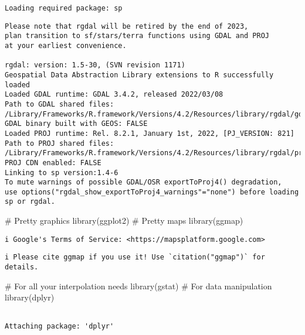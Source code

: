 \documentclass[
  letterpaper,
  krantz2]{style/krantz}
\newenvironment{Shaded}{\begin{snugshade}}{\end{snugshade}}
\newcommand{\CommentTok}[1]{\textcolor[rgb]{0.37,0.37,0.37}{#1}}
\newcommand{\FunctionTok}[1]{\textcolor[rgb]{0.28,0.35,0.67}{#1}}
\newcommand{\NormalTok}[1]{\textcolor[rgb]{0.00,0.23,0.31}{#1}}
\begin{document}
\begin{verbatim}
Loading required package: sp
\end{verbatim}

\begin{verbatim}
Please note that rgdal will be retired by the end of 2023,
plan transition to sf/stars/terra functions using GDAL and PROJ
at your earliest convenience.

rgdal: version: 1.5-30, (SVN revision 1171)
Geospatial Data Abstraction Library extensions to R successfully loaded
Loaded GDAL runtime: GDAL 3.4.2, released 2022/03/08
Path to GDAL shared files: /Library/Frameworks/R.framework/Versions/4.2/Resources/library/rgdal/gdal
GDAL binary built with GEOS: FALSE 
Loaded PROJ runtime: Rel. 8.2.1, January 1st, 2022, [PJ_VERSION: 821]
Path to PROJ shared files: /Library/Frameworks/R.framework/Versions/4.2/Resources/library/rgdal/proj
PROJ CDN enabled: FALSE
Linking to sp version:1.4-6
To mute warnings of possible GDAL/OSR exportToProj4() degradation,
use options("rgdal_show_exportToProj4_warnings"="none") before loading sp or rgdal.
\end{verbatim}

\begin{Shaded}
\begin{Highlighting}[]
\CommentTok{\# Pretty graphics}
\FunctionTok{library}\NormalTok{(ggplot2)}
\CommentTok{\# Pretty maps}
\FunctionTok{library}\NormalTok{(ggmap)}
\end{Highlighting}
\end{Shaded}

\begin{verbatim}
i Google's Terms of Service: <https://mapsplatform.google.com>
\end{verbatim}

\begin{verbatim}
i Please cite ggmap if you use it! Use `citation("ggmap")` for details.
\end{verbatim}

\begin{Shaded}
\begin{Highlighting}[]
\CommentTok{\# For all your interpolation needs}
\FunctionTok{library}\NormalTok{(gstat)}
\CommentTok{\# For data manipulation}
\FunctionTok{library}\NormalTok{(dplyr)}
\end{Highlighting}
\end{Shaded}

\begin{verbatim}

Attaching package: 'dplyr'
\end{verbatim}
\end{document}
